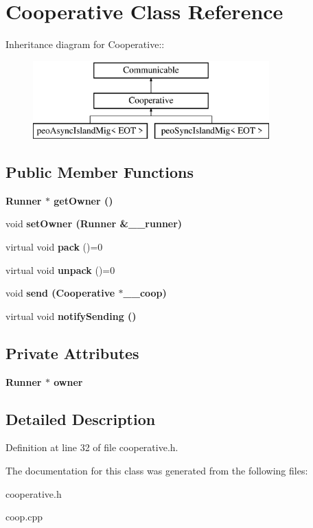 \section{Cooperative Class Reference}
\label{class_cooperative}
Inheritance diagram for Cooperative::\begin{figure}[H]
\begin{center}
\leavevmode
\includegraphics[height=3cm]{class_cooperative}
\end{center}
\end{figure}
\subsection*{Public Member Functions}
\begin{CompactItemize}
\item 
\bf{Runner} $\ast$ \bf{get\-Owner} ()\label{class_cooperative_4012b4e8329e87d26ee266491e1a883e}

\item 
void \bf{set\-Owner} (\bf{Runner} \&\_\-\_\-runner)\label{class_cooperative_fe7b022567174c8305bc78d8c5749b12}

\item 
virtual void \textbf{pack} ()=0\label{class_cooperative_6a4848c94031289df281a571ea427d46}

\item 
virtual void \textbf{unpack} ()=0\label{class_cooperative_7c31a68fb29e0a9cbe1da8019e4cdafa}

\item 
void \bf{send} (\bf{Cooperative} $\ast$\_\-\_\-coop)\label{class_cooperative_c609f2a1200da7d1ac96005602515fc6}

\item 
virtual void \bf{notify\-Sending} ()\label{class_cooperative_4439ddeaa1246a2e44c003bfb781739b}

\end{CompactItemize}
\subsection*{Private Attributes}
\begin{CompactItemize}
\item 
\bf{Runner} $\ast$ \bf{owner}\label{class_cooperative_7604f094479d08154ede4996a45bf79e}

\end{CompactItemize}


\subsection{Detailed Description}




Definition at line 32 of file cooperative.h.

The documentation for this class was generated from the following files:\begin{CompactItemize}
\item 
cooperative.h\item 
coop.cpp\end{CompactItemize}
